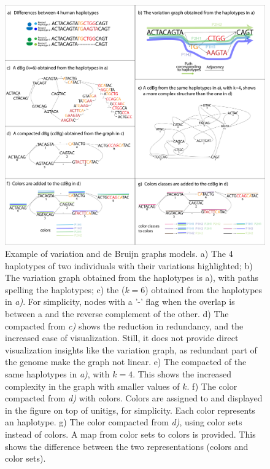 \begin{figure}[H]
	\centering
	\includegraphics[width=\linewidth]{figures/background/vg_dbg.pdf}
	\caption[Variation and de Bruijn graphs models.]{Example of variation and de Bruijn graphs models. a) The 4 haplotypes of two individuals with their variations highlighted;
		b) The variation graph obtained from the haplotypes is a), with paths spelling the haplotypes;
		c) the \dbg ($k=6$) obtained from the haplotypes in \emph{a)}. For simplicity, nodes with a '-' flag when the overlap is between a \kmer and the reverse complement of the other. 
		d) The compacted \dbg from \emph{c)} shows the reduction in redundancy, and the increased ease of visualization. Still, it does not provide direct visualization insights like the variation graph, as redundant part of the genome make the graph not linear.
		e) The compacted \dbg of the same haplotypes in  \emph{a)}, with $k=4$. This shows the increased complexity in the graph with smaller values of $k$.
		f) The color compacted \dbg from  \emph{d)} with colors. Colors are assigned to \kmers and displayed in the figure on top of unitigs, for simplicity. Each color represents an haplotype.
		g) The color compacted \dbg from  \emph{d)}, using color sets instead of colors. A map from color sets to colors is provided. This shows the difference between the two representations (colors and color sets). }
	\label{fig:dbg_vg}
\end{figure}

